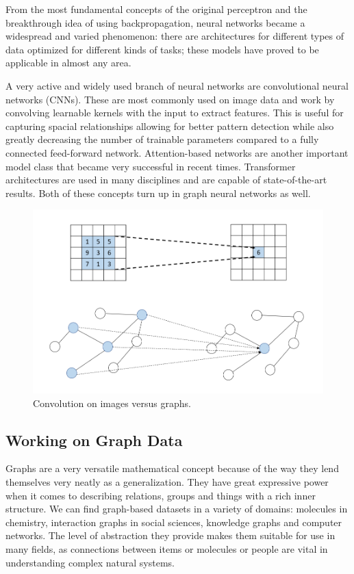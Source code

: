 	From the most fundamental concepts of the original perceptron and the breakthrough idea of using backpropagation, neural networks became a widespread and varied phenomenon: there are architectures for different types of data optimized for different kinds of tasks; these models have proved to be applicable in almost any area.
	
	A very active and widely used branch of neural networks are convolutional neural networks (CNNs). These are most commonly used on image data and work by convolving learnable kernels with the input to extract features. This is useful for capturing spacial relationships allowing for better pattern detection while also greatly decreasing the number of trainable parameters compared to a fully connected feed-forward network. Attention-based networks are another important model class that became very successful in recent times. Transformer architectures are used in many disciplines and are capable of state-of-the-art results. Both of these concepts turn up in graph neural networks as well.
	
	\begin{figure}[!h]
		\centering
		\includegraphics[width=\textwidth]{figures/convolution.png}
		\caption{Convolution on images versus graphs.}
	\end{figure}
	
	\subsection{Working on Graph Data}
	
	Graphs are a very versatile mathematical concept because of the way they lend themselves very neatly as a generalization. They have great expressive power when it comes to describing relations, groups and things with a rich inner structure. We can find graph-based datasets in a variety of domains: molecules in chemistry, interaction graphs in social sciences, knowledge graphs and computer networks. The level of abstraction they provide makes them suitable for use in many fields, as connections between items or molecules or people are vital in understanding complex natural systems.
	
